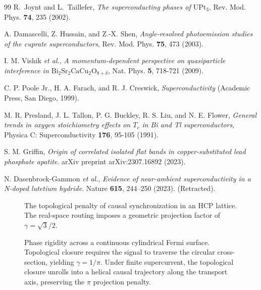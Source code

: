 \documentclass[11pt,a4paper]{article}
\begin{document}
\begin{thebibliography}{99}
R.~Joynt and L.~Taillefer,
\textit{The superconducting phases of $\text{UPt}_3$},
Rev. Mod. Phys. \textbf{74}, 235 (2002).

A. Damascelli, Z. Hussain, and Z.-X. Shen, 
\textit{Angle-resolved photoemission studies of the cuprate superconductors}, 
Rev. Mod. Phys. \textbf{75}, 473 (2003).

I. M. Vishik \textit{et al.}, 
\textit{A momentum-dependent perspective on quasiparticle interference in $\text{Bi}_2\text{Sr}_2\text{CaCu}_2\text{O}_{8+\delta}$}, 
Nat. Phys. \textbf{5}, 718-721 (2009). %

C. P. Poole Jr., H. A. Farach, and R. J. Creswick, 
\textit{Superconductivity} (Academic Press, San Diego, 1999).

M. R. Presland, J. L. Tallon, P. G. Buckley, R. S. Liu, and N. E. Flower, 
\textit{General trends in oxygen stoichiometry effects on $T_c$ in Bi and Tl superconductors}, 
Physica C: Superconductivity \textbf{176}, 95-105 (1991).

S. M. Griffin, \textit{Origin of correlated isolated flat bands in copper-substituted lead phosphate apatite}. arXiv preprint arXiv:2307.16892 (2023).

N. Dasenbrock-Gammon \textit{et al.}, \textit{Evidence of near-ambient superconductivity in a N-doped lutetium hydride}. Nature \textbf{615}, 244--250 (2023). (Retracted).

\end{thebibliography}

\begin{figure}[htbp]
    \centering
    
    \caption{The topological penalty of causal synchronization in an HCP lattice. The real-space routing imposes a geometric projection factor of $\gamma = \sqrt{3}/2$.}
    \label{fig:hcp_routing}
\end{figure}

\begin{figure}[htbp]
    \centering
    
    \caption{Phase rigidity across a continuous cylindrical Fermi surface. Topological closure requires the signal to traverse the circular cross-section, yielding $\gamma = 1/\pi$. Under finite supercurrent, the topological closure unrolls into a helical causal trajectory along the transport axis, preserving the $\pi$ projection penalty.}
    \label{fig:fermi_surface}
\end{figure}
\end{document}
